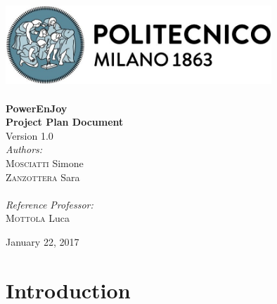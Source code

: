 \documentclass[11pt]{article} %
\newcommand{\pe}{PowerEnJoy }
\begin{document}
\begin{titlepage}

\newcommand{\HRule}{\rule{\linewidth}{0.5mm}} %
\center %

\includegraphics[width=10cm]{../DOC/polimiLogoNome.png}\\[0.5cm] %
 


\\[2cm]
{ \Huge \bfseries \pe} \\[0.5cm] %
{ \LARGE \bfseries Project Plan Document} \\[0.5cm]
{\large Version 1.0}
\\[2cm] 

\Large \emph{Authors:}\\
{\Large \textsc{Mosciatti}} Simone\\ %
{\Large \textsc{Zanzottera}} Sara\\
\\[1cm]
\emph{Reference Professor:} \\
{\Large \textsc{Mottola}} Luca %

\vfill %

{\large January 22, 2017}

\end{titlepage}


\newpage
\tableofcontents
\newpage


\section{Introduction}
\end{document}
